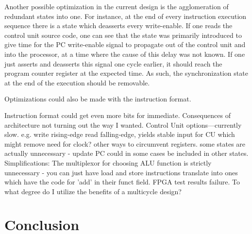 \documentclass[11pt]{article}
\begin{document}
Another possible optimization in the current design is the
agglomeration of redundant states into one. For instance, at the end
of every instruction execution sequence there is a state which
deasserts every write-enable. If one reads the control unit source
code, one can see that the state was primarily introduced to give time
for the PC write-enable signal to propagate out of the control unit
and into the processor, at a time where the cause of this delay was
not known. If one just asserts and deasserts this signal one cycle
earlier, it should reach the program counter register at the expected
time. As such, the synchronization state at the end of the execution
should be removable.

Optimizations could also be made with the instruction format. 

Instruction format could get even more bits for immediate. 
Consequences of architecture not turning out the way I wanted.
Control Unit options---currently slow. 
   e.g. write rising-edge read falling-edge, yields stable input for CU which might remove need for clock?
   other ways to circumvent registers.
   some states are actually unnecessary - update PC could in some cases be included in other states.
Simplifications:
    The multiplexor for choosing ALU function is strictly unnecessary - you can just have load and store instructions translate into ones which have the code for 'add' in their funct field.
FPGA test results failure.
To what degree do I utilize the benefits of a multicycle design?

\section{Conclusion}
\label{sec:conclusion}




\end{document}
